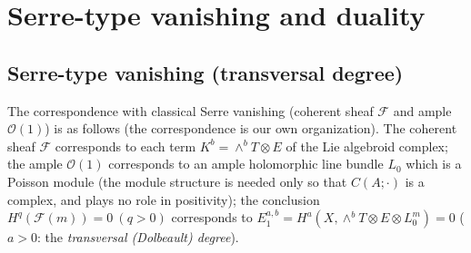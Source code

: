 \section{Serre-type vanishing and duality}\label{sec:serre}
\subsection{Serre-type vanishing (transversal degree)}
The correspondence with classical Serre vanishing (coherent sheaf $\mathcal F$ and ample $\mathcal O(1)$) is as follows \tK (the correspondence is our own organization). The coherent sheaf $\mathcal F$ corresponds to each term $K^b=\wedge^bT\otimes E$ of the Lie algebroid complex; the ample $\mathcal O(1)$ corresponds to an ample holomorphic line bundle $L_0$ which is a Poisson module (the module structure is needed only so that $C(A;\cdot)$ is a complex, and plays no role in positivity); the conclusion $H^q(\mathcal F(m))=0\ (q>0)$ corresponds to $E_1^{a,b}=H^a(X,\wedge^bT\otimes E\otimes L_0^m)=0$ ($a>0$: the \emph{transversal (Dolbeault) degree}).

